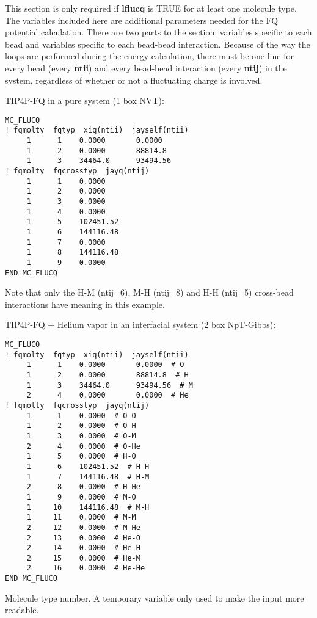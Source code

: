 \documentclass[12pt,letterpaper]{article}
\begin{document}
This section is only required if {\bf lflucq} is TRUE for at least one molecule type.
The variables included here are additional parameters needed for the
FQ potential calculation. There are two parts to the section: variables specific 
to each bead and variables specific to each bead-bead interaction.
Because of the way the loops are performed during the energy calculation, there 
must be one line for every bead (every {\bf ntii}) and every bead-bead interaction 
(every {\bf ntij}) in the system, regardless of whether or not a fluctuating charge
is involved.

\hfill\break
TIP4P-FQ in a pure system (1 box NVT):

\begin{verbatim}
MC_FLUCQ
! fqmolty  fqtyp  xiq(ntii)  jayself(ntii)
     1      1    0.0000       0.0000
     1      2    0.0000       88814.8
     1      3    34464.0      93494.56
! fqmolty  fqcrosstyp  jayq(ntij)
     1      1    0.0000
     1      2    0.0000
     1      3    0.0000
     1      4    0.0000
     1      5    102451.52
     1      6    144116.48
     1      7    0.0000
     1      8    144116.48
     1      9    0.0000
END MC_FLUCQ
\end{verbatim}

\noindent Note that only the H-M (ntij=6), M-H (ntij=8) and H-H (ntij=5) cross-bead 
interactions have meaning in this example.

\hfill\break
TIP4P-FQ + Helium vapor in an interfacial system (2 box NpT-Gibbs):

\begin{verbatim}
MC_FLUCQ
! fqmolty  fqtyp  xiq(ntii)  jayself(ntii)
     1      1    0.0000       0.0000  # O
     1      2    0.0000       88814.8  # H 
     1      3    34464.0      93494.56  # M
     2      4    0.0000       0.0000  # He
! fqmolty  fqcrosstyp  jayq(ntij)
     1      1    0.0000  # O-O
     1      2    0.0000  # O-H
     1      3    0.0000  # O-M
     2      4    0.0000  # O-He
     1      5    0.0000  # H-O
     1      6    102451.52  # H-H
     1      7    144116.48  # H-M
     2      8    0.0000  # H-He
     1      9    0.0000  # M-O
     1     10    144116.48  # M-H
     1     11    0.0000  # M-M
     2     12    0.0000  # M-He
     2     13    0.0000  # He-O
     2     14    0.0000  # He-H
     2     15    0.0000  # He-M
     2     16    0.0000  # He-He
END MC_FLUCQ
\end{verbatim}

 Molecule type number. A temporary variable only used to 
make the input more readable.
\end{document}
